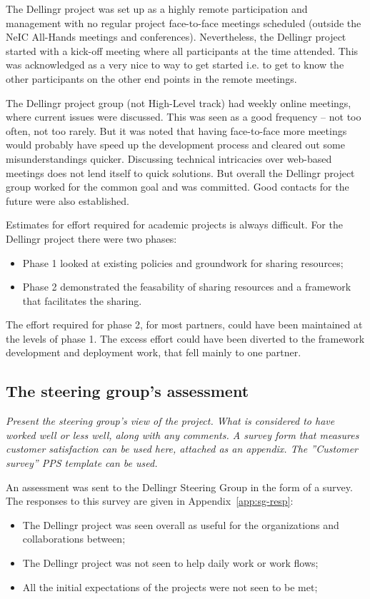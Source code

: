 \documentclass{article}
\newcommand{\dell}{Dellingr\xspace}
\newcommand{\HLT}{High-Level track\xspace}
\begin{document}

The \dell project was set up as a highly remote participation and management with no regular project face-to-face meetings scheduled (outside the NeIC All-Hands meetings and conferences).
Nevertheless, the \dell project started with a kick-off meeting where all participants at the time attended. 
This was acknowledged as a very nice to way to get started i.e. to get to know the other participants on the other end points in the remote meetings.

The \dell project group (not \HLT) had weekly online meetings, where current issues were discussed. 
This was seen as a good frequency -- not too often, not too rarely.
But it was noted that having face-to-face more meetings would probably have speed up the development process and cleared out some misunderstandings quicker. 
Discussing technical intricacies over web-based meetings does not lend itself to quick solutions.
But overall the \dell 
project group worked for the common goal and was committed. 
Good contacts for the future were also established.

Estimates for effort required for academic projects is always difficult.
For the \dell project there were two phases:
\begin{itemize}
\item Phase 1 looked at existing policies and groundwork for sharing resources;
\item Phase 2 demonstrated the feasability of sharing resources and a framework that facilitates the sharing.
\end{itemize}
The effort required for phase 2, for most partners, could have been maintained at the levels of phase 1.
The excess effort could have been diverted to the framework development and deployment work, that fell mainly to one partner.

\subsection{The steering group’s assessment}
{\it Present the steering group’s view of the project. What is considered to have worked well or less well, along with any comments.  A survey form that measures customer satisfaction can be used here, attached as an appendix. The ”Customer survey” PPS template can be used.}

An assessment was sent to the \dell Steering Group in the form of a survey.
The responses to this survey are given in Appendix~\ref{app:sg-resp}:
\begin{itemize}
\item The \dell project was seen overall as useful for the organizations and collaborations between;
\item The \dell project was not seen to help daily work or work flows;
\item All the initial expectations of the projects were not seen to be met;
\end{itemize}
\end{document}
